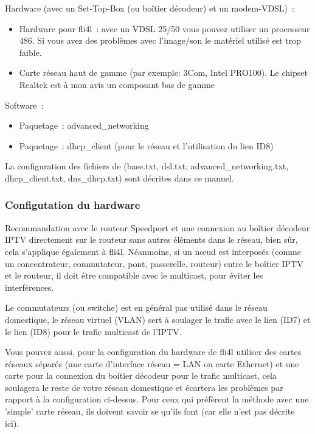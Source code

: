 Hardware (avec un Set-Top-Box (ou boîtier décodeur) et un modem-VDSL)~:
\begin{itemize}
   \item{Hardware pour fli4l~: avec un VDSL 25/50 vous pouvez utiliser un processeur 486. Si vous
   avez des problèmes avec l'image/son le matériel utilisé est trop faible.}
   \item{Carte réseau haut de gamme (par exemple: 3Com, Intel PRO100). Le chipset Realtek
   est à mon avis un composant bas de gamme}
\end{itemize}

Software~:
\begin{itemize}
   \item{Paquetage~: advanced\_networking}
   \item{Paquetage~: dhcp\_client (pour le réseau et l'utilisation du lien ID8)}
\end{itemize}

La configuration des fichiers de (base.txt, dsl.txt, advanced\_networking.txt, dhcp\_client.txt,
dns\_dhcp.txt) sont décrites dans ce manuel.

\subsubsection{Configutation du hardware}

Recommandation avec le routeur Speedport et une connexion au boîtier décodeur IPTV directement
sur le routeur sans autres éléments dans le réseau, bien sûr, cela s'applique également à fli4l.
Néanmoins, si un n\oe{}ud est interposés (comme un concentrateur, commutateur, pont, passerelle,
routeur) entre le boîtier IPTV et le routeur, il doit être compatible avec le multicast, pour
éviter les interférences.

Le commutateurs (ou switche) est en général pas utilisé dans le réseau domestique, le réseau
virtuel (VLAN) sert à soulager le trafic avec le lien (ID7) et le lien (ID8) pour le trafic
multicast de l'IPTV.

Vous pouvez aussi, pour la configuration du hardware de fli4l utiliser des cartes réseaux séparés
(une carte d'interface réseau = LAN ou carte Ethernet) et une carte pour la connexion du boitier
décodeur pour le trafic multicast, cela soulagera le reste de votre réseau domestique et écartera
les problèmes par rapport à la configuration ci-dessus. Pour ceux qui préfèrent la méthode avec
une 'simple' carte réseau, ils doivent savoir se qu'ils font (car elle n'est pas décrite ici).

